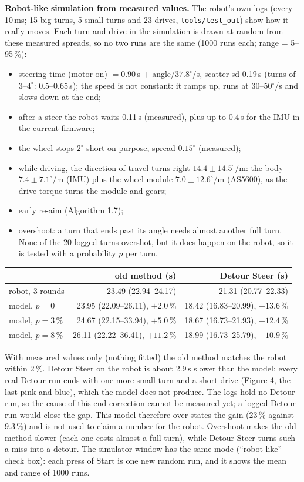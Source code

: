 \documentclass[11pt,a4paper]{article}
\begin{document}
{\smallskip
\noindent\textbf{Robot-like simulation from measured values.} The robot's own logs (every 10\,ms; 15 big turns,
5 small turns and 23 drives, \texttt{tools/test\_out}) show how it really moves. Each turn and drive in the
simulation is drawn at random from these measured spreads, so no two runs are the same (1000 runs each;
range = 5--95\,\%):
\begin{itemize}\setlength\itemsep{0pt}
\item steering time (motor on) $= 0.90$\,s $+$ angle$/37.8^\circ$/s, scatter sd 0.19\,s (turns of $3$--$4^\circ$: 0.5--0.65\,s);
  the speed is not constant: it ramps up, runs at 30--50$^\circ$/s and slows down at the end;
\item after a steer the robot waits 0.11\,s (measured), plus up to 0.4\,s for the IMU in the current firmware;
\item the wheel stops $2^\circ$ short on purpose, spread $0.15^\circ$ (measured);
\item while driving, the direction of travel turns right $14.4 \pm 14.5^\circ$/m: the body $7.4 \pm 7.1^\circ$/m (IMU)
  plus the wheel module $7.0 \pm 12.6^\circ$/m (AS5600), as the drive torque turns the module and gears;
\item early re-aim (Algorithm 1.7);
\item overshoot: a turn that ends past its angle needs almost another full turn. None of the 20 logged turns
  overshot, but it does happen on the robot, so it is tested with a probability $p$ per turn.
\end{itemize}
\begin{center}
\begin{tabular}{lrr}
\toprule
 & old method (s) & Detour Steer (s) \\
\midrule
robot, 3 rounds              & 23.49 (22.94--24.17) & 21.31 (20.77--22.33) \\
model, $p = 0$               & 23.95 (22.09--26.11), $+2.0\,\%$ & 18.42 (16.83--20.99), $-13.6\,\%$ \\
model, $p = 3\,\%$           & 24.67 (22.15--33.94), $+5.0\,\%$ & 18.67 (16.73--21.93), $-12.4\,\%$ \\
model, $p = 8\,\%$           & 26.11 (22.22--36.41), $+11.2\,\%$ & 18.99 (16.73--25.79), $-10.9\,\%$ \\
\bottomrule
\end{tabular}
\end{center}
With measured values only (nothing fitted) the old method matches the robot within 2\,\%. Detour Steer on the
robot is about 2.9\,s slower than the model: every real Detour run ends with one more small turn and a short
drive (Figure 4, the last pink and blue), which the model does not produce. The logs hold no Detour run, so
the cause of this end correction cannot be measured yet; a logged Detour run would close the gap. This model
therefore over-states the gain (23\,\% against 9.3\,\%) and is not used to claim a number for the robot.
Overshoot makes the old method slower (each one costs almost a full turn), while Detour Steer turns such a
miss into a detour. The simulator window has the same mode (``robot-like'' check box): each press of Start is
one new random run, and it shows the mean and range of 1000 runs.

}
\end{document}
